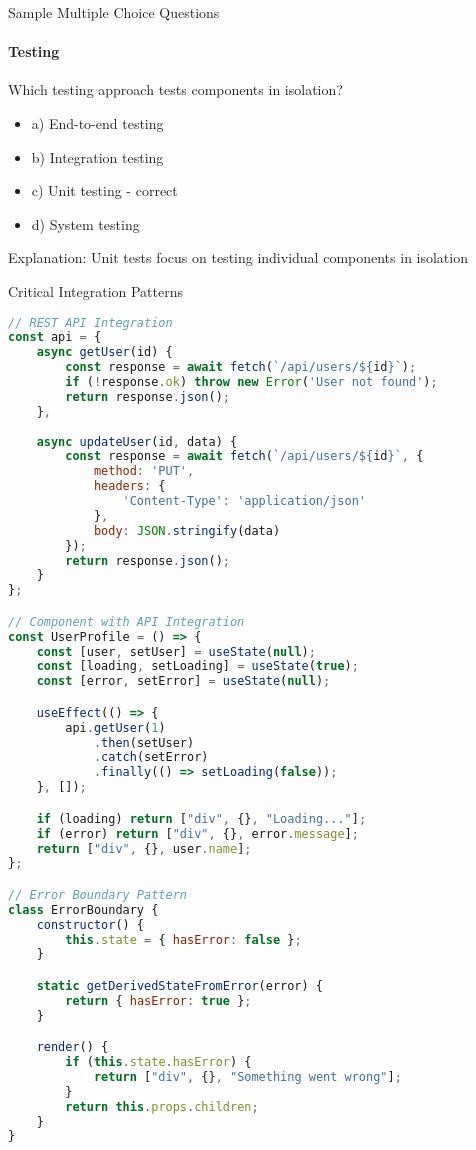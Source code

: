 \begin{KR}{Sample Multiple Choice Questions}
\paragraph{Testing}
Which testing approach tests components in isolation?
\begin{itemize}
    \item a) End-to-end testing
    \item b) Integration testing
    \item c) Unit testing - correct
    \item d) System testing
\end{itemize}
Explanation: Unit tests focus on testing individual components in isolation
\end{KR}

\begin{examplecode}{Critical Integration Patterns}
\begin{lstlisting}[language=JavaScript, style=basesmol]
// REST API Integration
const api = {
    async getUser(id) {
        const response = await fetch(`/api/users/${id}`);
        if (!response.ok) throw new Error('User not found');
        return response.json();
    },
    
    async updateUser(id, data) {
        const response = await fetch(`/api/users/${id}`, {
            method: 'PUT',
            headers: {
                'Content-Type': 'application/json'
            },
            body: JSON.stringify(data)
        });
        return response.json();
    }
};

// Component with API Integration
const UserProfile = () => {
    const [user, setUser] = useState(null);
    const [loading, setLoading] = useState(true);
    const [error, setError] = useState(null);

    useEffect(() => {
        api.getUser(1)
            .then(setUser)
            .catch(setError)
            .finally(() => setLoading(false));
    }, []);

    if (loading) return ["div", {}, "Loading..."];
    if (error) return ["div", {}, error.message];
    return ["div", {}, user.name];
};

// Error Boundary Pattern
class ErrorBoundary {
    constructor() {
        this.state = { hasError: false };
    }

    static getDerivedStateFromError(error) {
        return { hasError: true };
    }

    render() {
        if (this.state.hasError) {
            return ["div", {}, "Something went wrong"];
        }
        return this.props.children;
    }
}
\end{lstlisting}
\end{examplecode}

